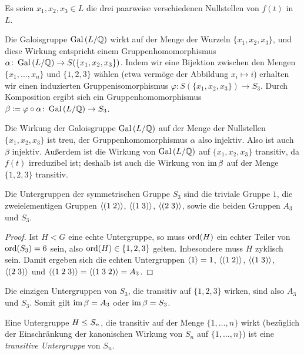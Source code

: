 Es seien $x_1, x_2, x_3 \in L$ die drei paarweise verschiedenen Nullstellen von $f(t)$ in $L$.

Die Galoisgruppe $\operatorname{Gal}{(}L/\mathbb{Q})$ wirkt auf der Menge der Wurzeln $\{x_1, x_2, x_3\}$, und diese Wirkung entspricht einem Gruppenhomomorphismus $\alpha \colon \operatorname{Gal}{(}L/\mathbb{Q}) \to S(\{x_1, x_2, x_3\})$.
Indem wir eine Bijektion zwischen den Mengen $\{x_1, \dotsc, x_n\}$ und $\{1, 2, 3\}$ wählen (etwa vermöge der Abbildung $x_i \mapsto i$) erhalten wir einen induzierten Gruppenisomorphismus $\varphi \colon S(\{x_1, x_2, x_3\}) \to S_3$.
Durch Komposition ergibt sich ein Gruppenhomomorphismus $\beta \coloneqq \varphi \circ \alpha \colon \operatorname{Gal}{(}L/\mathbb{Q}) \to S_3$.

Die Wirkung der Galoisgruppe $\operatorname{Gal}{(}L/\mathbb{Q})$ auf der Menge der Nullstellen $\{x_1, x_2, x_3\}$ ist treu, der Gruppenhomomorphismus $\alpha$ also injektiv.
Also ist auch $\beta$ injektiv.
Außerdem ist die Wirkung von $\operatorname{Gal}{(}L/\mathbb{Q})$ auf $\{x_1, x_2, x_3\}$ transitiv, da $f(t)$ irreduzibel ist;
deshalb ist auch die Wirkung von $\operatorname{im} \beta$ auf der Menge $\{1, 2, 3\}$ transitiv.

\begin{lemma}
  Die Untergruppen der symmetrischen Gruppe $S_3$ sind die triviale Gruppe $1$, die zweielementigen Gruppen $\langle(1\;2)\rangle$, $\langle(1\;3)\rangle$, $\langle(2\;3)\rangle$, sowie die beiden Gruppen $A_3$ und $S_3$.
\end{lemma}

\begin{proof}
  Ist $H < G$ eine echte Untergruppe, so muss $\operatorname{ord}(H)$ ein echter Teiler von $\operatorname{ord}(S_3) = 6$ sein, also $\operatorname{ord}(H) \in \{1, 2, 3\}$ gelten.
  Inbesondere muss $H$ zyklisch sein.
  Damit ergeben sich die echten Untergruppen $\langle1\rangle = 1$, $\langle(1\;2)\rangle$, $\langle(1\;3)\rangle$, $\langle(2\;3)\rangle$ und $\langle(1\;2\;3)\rangle = \langle(1\;3\;2)\rangle = A_3$.
\end{proof}

Die einzigen Untergruppen von $S_3$, die transitiv auf $\{1, 2, 3\}$ wirken, sind also $A_3$ und $S_3$.
Somit gilt $\operatorname{im} \beta = A_3$ oder $\operatorname{im} \beta = S_3$.

\begin{remark}
  Eine Untergruppe $H \leq S_n$, die transitiv auf der Menge $\{1, \dotsc, n\}$ wirkt (bezüglich der Einschränkung der kanonischen Wirkung von $S_n$ auf $\{1, \dotsc, n\}$) ist eine \emph{transitive Untergruppe} von $S_n$.
\end{remark}





